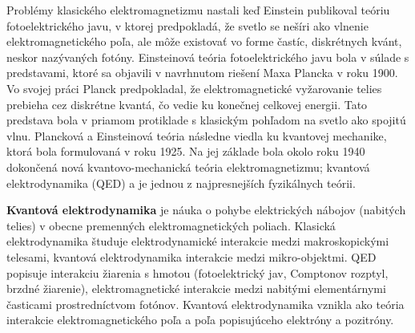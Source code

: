 \documentclass[../../main.tex]{subfiles}
\begin{document}
Problémy klasického elektromagnetizmu nastali keď Einstein publikoval teóriu fotoelektrického javu, v ktorej predpokladá, že svetlo se nešíri ako vlnenie elektromagnetického poľa, ale môže existovať vo forme častíc, diskrétnych kvánt, neskor nazývaných fotóny. Einsteinová teória fotoelektrického javu bola v súlade s predstavami, ktoré sa objavili v navrhnutom riešení Maxa Plancka v roku 1900. Vo svojej práci Planck predpokladal, že elektromagnetické vyžarovanie telies prebieha cez diskrétne kvantá, čo vedie ku konečnej celkovej energii. Tato predstava bola v priamom protiklade s klasickým pohľadom na svetlo ako spojitú vlnu. Plancková a Einsteinová teória následne viedla ku kvantovej mechanike, ktorá bola formulovaná v roku 1925. Na jej základe bola okolo roku 1940 dokončená nová kvantovo-mechanická teória elektromagnetizmu; kvantová elektrodynamika (QED) a je jednou z najpresnejších fyzikálnych teórii.

\textbf{Kvantová elektrodynamika} je náuka o pohybe elektrických nábojov (nabitých telies) v obecne premenných elektromagnetických poliach. Klasická elektrodynamika študuje elektrodynamické interakcie medzi makroskopickými telesami, kvantová elektrodynamika interakcie medzi mikro-objektmi. QED popisuje interakciu žiarenia s hmotou (fotoelektrický jav, Comptonov rozptyl, brzdné žiarenie), elektromagnetické interakcie medzi nabitými elementárnymi časticami prostredníctvom fotónov. Kvantová elektrodynamika vznikla ako teória interakcie elektromagnetického poľa a poľa popisujúceho elektróny a pozitróny.
\end{document}
